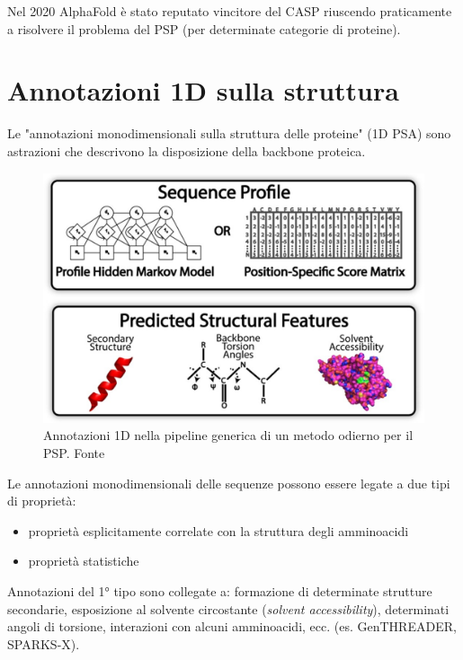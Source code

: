 \par Nel 2020 AlphaFold è stato reputato vincitore del CASP riuscendo praticamente a risolvere il problema del PSP (per determinate categorie di proteine). 


\section{Annotazioni 1D sulla struttura} \label{sec:predizione-structural-features}

Le "annotazioni monodimensionali sulla struttura delle proteine" (1D PSA) sono astrazioni che descrivono la disposizione della backbone proteica. 

\begin{figure}[!htb]
	\centering
	\includegraphics[scale=1.5]{images/1dpsa.png}
	\caption{Annotazioni 1D nella pipeline generica di un metodo odierno per il PSP. Fonte\cite{pearce2021deep}}
	\label{fig:1dpsa}
\end{figure}

Le annotazioni monodimensionali delle sequenze possono essere legate a due tipi di proprietà:
\begin{itemize}
	\item proprietà esplicitamente correlate con la struttura degli amminoacidi
	\item proprietà statistiche
\end{itemize}

Annotazioni del 1° tipo sono collegate a: formazione di determinate strutture secondarie, esposizione al solvente circostante (\textit{solvent accessibility}), determinati angoli di torsione, interazioni con alcuni amminoacidi, ecc. (es. GenTHREADER, SPARKS-X).

